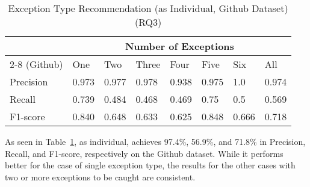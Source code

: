 \begin{table}[t]%
  \caption{Exception Type Recommendation (\xtype as Individual, Github Dataset) (RQ3)}
  \vspace{-12pt}
  \small
	\begin{center}
		\renewcommand{\arraystretch}{1}
		\begin{tabular}{| p{1.2cm}<{\centering} | p{0.6cm}<{\centering} | p{0.6cm}<{\centering}| p{0.6cm}<{\centering} | p{0.6cm}<{\centering} | p{0.6cm}<{\centering} | p{0.6cm}<{\centering} | p{0.6cm}<{\centering} |}
		  \hline
			\multirow{2}{*}{{\xtype}} & \multicolumn{7}{c|}{Number of Exceptions} \\
			\cline{2-8}
			(Github) & One & Two & Three & Four & Five & Six & All\\
			\hline
			Precision &  0.973 & 0.977 & 0.978 & 0.938 & 0.975 & 1.0 & 0.974\\
			\hline
			Recall &  0.739 & 0.484 & 0.468 & 0.469 & 0.75 & 0.5 & 0.569\\
			\hline
			F1-score &  0.840 & 0.648 & 0.633 & 0.625 & 0.848 & 0.666 & 0.718\\
			\hline
		\end{tabular}
		\label{tab:xtype-1}
	\end{center}
\end{table}

As seen in Table~\ref{tab:xtype-1}, as individual, {\xtype}
achieves 97.4\%, 56.9\%, and 71.8\% in Precision, Recall, and
F1-score, respectively on the Github dataset. While it performs better
for the case of single exception type, the results for the other cases
with two or more exceptions to be caught are consistent.
